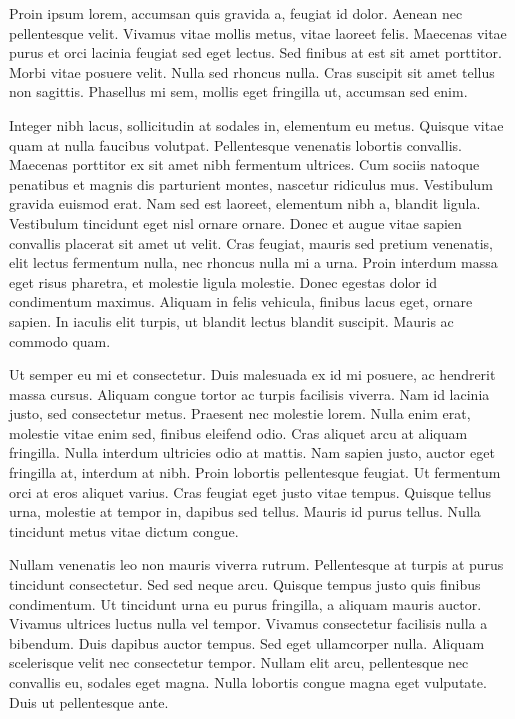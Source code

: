 \documentclass[book,A4paper,10pt,twoside,oldfontcommands]{memoir}\usepackage[]{graphicx}\usepackage[usenames,dvipsnames]{color}
\begin{document}
Proin ipsum lorem, accumsan quis gravida a, feugiat id dolor. Aenean
nec pellentesque velit. Vivamus vitae mollis metus, vitae laoreet
felis. Maecenas vitae purus et orci lacinia feugiat sed eget lectus.
Sed finibus at est sit amet porttitor. Morbi vitae posuere velit.
Nulla sed rhoncus nulla. Cras suscipit sit amet tellus non sagittis.
Phasellus mi sem, mollis eget fringilla ut, accumsan sed enim. 

Integer nibh lacus, sollicitudin at sodales in, elementum eu metus.
Quisque vitae quam at nulla faucibus volutpat. Pellentesque venenatis
lobortis convallis. Maecenas porttitor ex sit amet nibh fermentum
ultrices. Cum sociis natoque penatibus et magnis dis parturient
montes, nascetur ridiculus mus. Vestibulum gravida euismod erat. Nam
sed est laoreet, elementum nibh a, blandit ligula. Vestibulum
tincidunt eget nisl ornare ornare. Donec et augue vitae sapien
convallis placerat sit amet ut velit. Cras feugiat, mauris sed pretium
venenatis, elit lectus fermentum nulla, nec rhoncus nulla mi a urna.
Proin interdum massa eget risus pharetra, et molestie ligula molestie.
Donec egestas dolor id condimentum maximus. Aliquam in felis vehicula,
finibus lacus eget, ornare sapien. In iaculis elit turpis, ut blandit
lectus blandit suscipit. Mauris ac commodo quam. 

Ut semper eu mi et consectetur. Duis malesuada ex id mi posuere, ac
hendrerit massa cursus. Aliquam congue tortor ac turpis facilisis
viverra. Nam id lacinia justo, sed consectetur metus. Praesent nec
molestie lorem. Nulla enim erat, molestie vitae enim sed, finibus
eleifend odio. Cras aliquet arcu at aliquam fringilla. Nulla interdum
ultricies odio at mattis. Nam sapien justo, auctor eget fringilla at,
interdum at nibh. Proin lobortis pellentesque feugiat. Ut fermentum
orci at eros aliquet varius. Cras feugiat eget justo vitae tempus.
Quisque tellus urna, molestie at tempor in, dapibus sed tellus. Mauris
id purus tellus. Nulla tincidunt metus vitae dictum congue. 

Nullam venenatis leo non mauris viverra rutrum. Pellentesque at turpis
at purus tincidunt consectetur. Sed sed neque arcu. Quisque tempus
justo quis finibus condimentum. Ut tincidunt urna eu purus fringilla,
a aliquam mauris auctor. Vivamus ultrices luctus nulla vel tempor.
Vivamus consectetur facilisis nulla a bibendum. Duis dapibus auctor
tempus. Sed eget ullamcorper nulla. Aliquam scelerisque velit nec
consectetur tempor. Nullam elit arcu, pellentesque nec convallis eu,
sodales eget magna. Nulla lobortis congue magna eget vulputate. Duis
ut pellentesque ante. 
\end{document}

